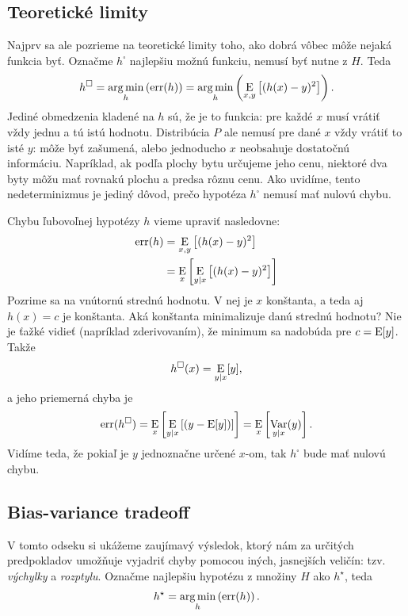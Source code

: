 \subsection{Teoretické limity}
Najprv sa ale pozrieme na teoretické limity toho, ako dobrá vôbec
môže nejaká funkcia byť. Označme $h^{\square}$ najlepšiu možnú funkciu,
nemusí byť nutne z $H$. Teda
$$h^{\square} = \operatorname*{arg\,min}_h \left( \mathrm{err}(h) \right) = \operatorname*{arg\,min}_h \left( \operatorname*{\mathrm{E}}_{x,y} \left[ (h(x) - y)^2 \right] \right).$$
Jediné obmedzenia kladené na $h$ sú, že je to funkcia: pre každé $x$
musí vrátiť vždy jednu a tú istú hodnotu. Distribúcia $P$ ale nemusí
pre dané $x$ vždy vrátiť to isté $y$: môže byť zašumená, alebo
jednoducho $x$ neobsahuje dostatočnú informáciu. Napríklad, ak podľa
plochy bytu určujeme jeho cenu, niektoré dva byty môžu mať rovnakú
plochu a predsa rôznu cenu. Ako uvidíme, tento nedeterminizmus je
jediný dôvod, prečo hypotéza $h^{\square}$ nemusí mať nulovú chybu.

Chybu ľubovoľnej hypotézy $h$ vieme upraviť nasledovne:
\begin{align}
  \mathrm{err}(h)
    &= \operatorname*{\mathrm{E}}_{x,y} \left[ (h(x) - y)^2 \right] \\
    &= \operatorname*{\mathrm{E}}_{x} \left[ \operatorname*{\mathrm{E}}_{y|x} \left[ (h(x) - y)^2 \right] \right]
\end{align}
Pozrime sa na vnútornú strednú hodnotu. V nej je $x$ konštanta, a
teda aj $h(x) = c$ je konštanta. Aká konštanta minimalizuje danú
strednú hodnotu? Nie je ťažké vidieť (napríklad zderivovaním), že
minimum sa nadobúda pre $c = \operatorname*{\mathrm{E}}[y]$. Takže
$$h^{\square}(x) = \operatorname*{\mathrm{E}}_{y|x}[y],$$
a jeho priemerná chyba je
$$\mathrm{err}(h^{\square}) = \operatorname*{\mathrm{E}}_{x} \left[ \operatorname*{\mathrm{E}}_{y|x} \left[ (y - \operatorname*{\mathrm{E}}[y]) \right] \right] = \operatorname*{\mathrm{E}}_{x} \left[ \operatorname*{\mathrm{Var}}_{y|x}(y) \right].$$
Vidíme teda, že pokiaľ je $y$ jednoznačne určené $x$-om, tak
$h^{\square}$ bude mať nulovú chybu.



\subsection{Bias-variance tradeoff}
V tomto odseku si ukážeme zaujímavý výsledok, ktorý nám za určitých
predpokladov umožňuje vyjadriť chyby pomocou iných, jasnejších veličín:
tzv. \emph{výchylky} a \emph{rozptylu}.
Označme najlepšiu hypotézu z množiny $H$ ako $h^\star$, teda
$$h^\star = \operatorname*{arg\,min}_h \left( \mathrm{err}(h) \right).$$


